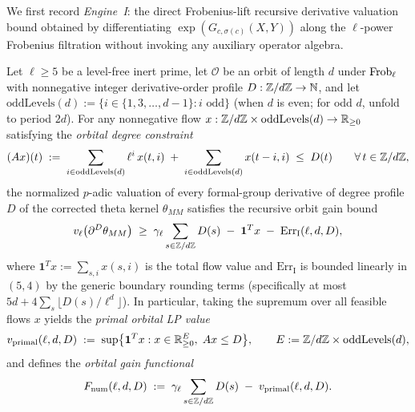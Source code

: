 We first record \emph{Engine~I}: the direct Frobenius-lift recursive derivative valuation bound obtained by differentiating $\exp(G_{c,\sigma(c)}(X, Y))$ along the $\ell$-power Frobenius filtration without invoking any auxiliary operator algebra.

\begin{proposition}
\label{prop:08:engine-one}
Let $\ell \ge 5$ be a level-free inert prime, let $\mathcal{O}$ be an orbit of length $d$ under $\mathrm{Frob}_\ell$ with nonnegative integer derivative-order profile $D : \mathbb{Z}/d\mathbb{Z} \to \mathbb{N}$, and let $\mathrm{oddLevels}(d) := \{i \in \{1, 3, \dots, d-1\} : i \text{ odd}\}$ (when $d$ is even; for odd $d$, unfold to period $2d$). For any nonnegative flow $x : \mathbb{Z}/d\mathbb{Z} \times \mathrm{oddLevels}(d) \to \mathbb{R}_{\ge 0}$ satisfying the \emph{orbital degree constraint}
\begin{equation}
\label{eq:08:flow-constraint}
  (A x)(t) \;:=\; \sum_{i \in \mathrm{oddLevels}(d)} \ell^i\, x(t, i) \;+\; \sum_{i \in \mathrm{oddLevels}(d)} x(t - i, i) \;\le\; D(t)
  \qquad \forall\, t \in \mathbb{Z}/d\mathbb{Z},
\end{equation}
the normalized $p$-adic valuation of every formal-group derivative of degree profile $D$ of the corrected theta kernel $\theta_{MM}$ satisfies the recursive orbit gain bound
\begin{equation}
\label{eq:08:engine-one-bound}
  v_\ell\bigl(\partial^D \theta_{MM}\bigr)
  \;\ge\; \gamma_\ell \sum_{s \in \mathbb{Z}/d\mathbb{Z}} D(s) \;-\; \mathbf{1}^T x \;-\; \mathrm{Err}_{\mathrm{I}}(\ell, d, D),
\end{equation}
where $\mathbf{1}^T x := \sum_{s, i} x(s, i)$ is the total flow value and $\mathrm{Err}_{\mathrm{I}}$ is bounded linearly in $(5, 4)$ by the generic boundary rounding terms (specifically at most $5 d + 4 \sum_s \lfloor D(s) / \ell^{d} \rfloor$). In particular, taking the supremum over all feasible flows $x$ yields the \emph{primal orbital LP value}
\[
  v_{\mathrm{primal}}(\ell, d, D) \;:=\; \sup\bigl\{\mathbf{1}^T x : x \in \mathbb{R}_{\ge 0}^{E},\; A x \le D\bigr\},
  \qquad E := \mathbb{Z}/d\mathbb{Z} \times \mathrm{oddLevels}(d),
\]
and defines the \emph{orbital gain functional}
\begin{equation}
\label{eq:08:fnum-def}
  F_{\mathrm{num}}(\ell, d, D) \;:=\; \gamma_\ell \sum_{s \in \mathbb{Z}/d\mathbb{Z}} D(s) \;-\; v_{\mathrm{primal}}(\ell, d, D).
\end{equation}
\end{proposition}

